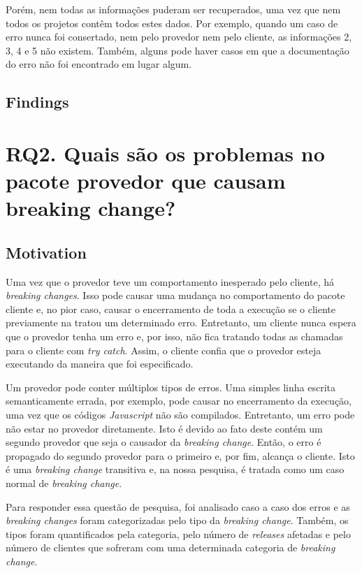 Porém, nem todas as informações puderam ser recuperados, uma vez que nem todos os projetos contêm todos estes dados. Por exemplo, quando um caso de erro nunca foi consertado, nem pelo provedor nem pelo cliente, as informações 2, 3, 4 e 5 não existem. Também, alguns pode haver casos em que a documentação do erro não foi encontrado em lugar algum.

\subsection{Findings}
\label{fin:rq1}

\section{RQ2. Quais são os problemas no pacote provedor que causam breaking change?}
\label{sec:rq2}

\subsection{Motivation}
\label{mot:rq2}

Uma vez que o provedor teve um comportamento inesperado pelo cliente, há \textit{breaking changes}. Isso pode causar uma mudança no comportamento do pacote cliente e, no pior caso, causar o encerramento de toda a execução se o cliente previamente na tratou um determinado erro. Entretanto, um cliente nunca espera que o provedor tenha um erro e, por isso, não fica tratando todas as chamadas para o cliente com \textit{try catch}. Assim, o cliente confia que o provedor esteja executando da maneira que foi especificado.

Um provedor pode conter múltiplos tipos de erros. Uma simples linha escrita semanticamente errada, por exemplo, pode causar no encerramento da execução, uma vez que os códigos \textit{Javascript} não são compilados. Entretanto, um erro pode não estar no provedor diretamente. Isto é devido ao fato deste contém um segundo provedor que seja o causador da \textit{breaking change}. Então, o erro é propagado do segundo provedor para o primeiro e, por fim, alcança o cliente. Isto é uma \textit{breaking change} transitiva e, na nossa pesquisa, é tratada como um caso normal de \textit{breaking change}.

Para responder essa questão de pesquisa, foi analisado caso a caso dos erros e as \textit{breaking changes} foram categorizadas pelo tipo da \textit{breaking change}. Também, os tipos foram quantificados pela categoria, pelo número de \textit{releases} afetadas e pelo número de clientes que sofreram com uma determinada categoria de \textit{breaking change}.

